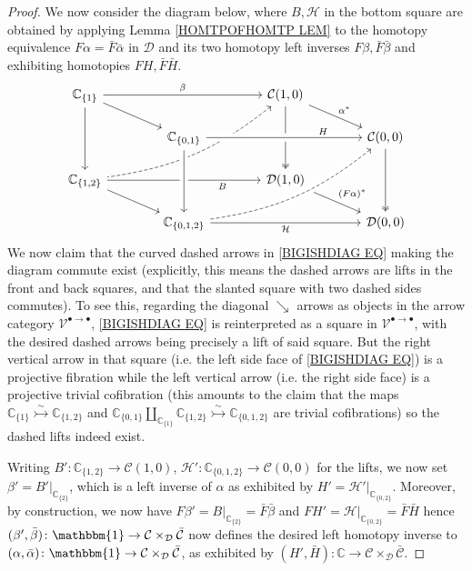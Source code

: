 \documentclass[a4paper,10pt
,draft
]{article}%
\numberwithin{equation}{section}
\numberwithin{figure}{section}
\theoremstyle{definition} %
\newcommand{\V}{\ensuremath{\mathcal V}}
\newcommand{\1}{\ensuremath{\mathbbm 1}}%
\begin{document}
\begin{proof}
We now consider the diagram below, 
where $B, \mathcal{H}$ in the bottom square
are obtained by applying Lemma \ref{HOMTPOFHOMTP LEM}
to the homotopy equivalence 
$F\alpha = \bar{F} \bar{\alpha}$ in $\mathcal{D}$
and its two homotopy left inverses
$F\beta, \bar{F} \bar{\beta}$
and exhibiting homotopies
$F H, \bar{F} \bar{H}$.
\begin{equation}\label{BIGISHDIAG EQ}
\begin{tikzcd}[row sep = 15pt,column sep = 40pt]
	\mathbb{C}_{\{1\}} 	\ar{rr}{\beta} \ar{rd} \ar{dd}&&
	\mathcal{C}(1,0) \ar[twoheadrightarrow]{dd} \ar{dr}{\alpha^{\**}}
	\ar[dashed,leftarrow,bend left =15]{ddll}
\\
	&
	\mathbb{C}_{\{0,1\}} \arrow[crossing over]{rr}[near end]{H} &&
	\mathcal{C}(0,0)  
	\ar[twoheadrightarrow]{dd}
\\
	\mathbb{C}_{\{1,2\}} \ar{rr}[swap,near end]{B} \ar{rd} &&
	\mathcal{D}(1,0) \ar{rd}{(F\alpha)^{\**}}
\\
	&
	\mathbb{C}_{\{0,1,2\}}
	\ar[dashed,bend right =15,crossing over]{uurr}
	\ar{rr}[swap]{\mathcal{H}} \arrow[uu, leftarrow, crossing over] &&
	\mathcal{D}(0,0)
\end{tikzcd}
\end{equation}
We now claim that the curved dashed arrows in 
\eqref{BIGISHDIAG EQ}
making the diagram commute exist
(explicitly, this means the dashed arrows are lifts in the front and back squares, and that the slanted square with two dashed sides commutes).
To see this, regarding the diagonal $\searrow$ arrows as objects in the arrow category $\V^{\bullet \to \bullet}$, 
\eqref{BIGISHDIAG EQ}
is reinterpreted as a square in $\V^{\bullet \to \bullet}$,
with the desired dashed arrows being precisely a lift of said square.
But the right vertical arrow in that square
(i.e. the left side face of \eqref{BIGISHDIAG EQ}) is a projective fibration 
while the left vertical arrow 
(i.e. the right side face)
is a projective trivial cofibration
(this amounts to the claim that the maps
$\mathbb{C}_{\{1\}} \overset{\sim}{\rightarrowtail} \mathbb{C}_{\{1,2\}}$ and
$\mathbb{C}_{\{0,1\}} \amalg_{\mathbb{C}_{\{1\}}} \mathbb{C}_{\{1,2\}} \overset{\sim}{\rightarrowtail} \mathbb{C}_{\{0,1,2\}}$
are trivial cofibrations)
so the dashed lifts indeed exist.

Writing 
$B'\colon \mathbb{C}_{\{1,2\}} \to \mathcal{C}(1,0)$,
$\mathcal{H}' \colon \mathbb{C}_{\{0,1,2\}} \to \mathcal{C}(0,0)$
for the lifts,
we now set
$\beta' = B'|_{\mathbb{C}_{\{2\}}}$,
which is a left inverse of $\alpha$
as exhibited by $H' = \mathcal{H}'|_{\mathbb{C}_{\{0,2\}}}$.
Moreover, by construction, we now have
$F\beta' = B|_{\mathbb{C}_{\{2\}}} = \bar{F} \bar{\beta}$
and 
$FH' = \mathcal{H}|_{\mathbb{C}_{\{0,2\}}} = \bar{F} \bar{H}$
hence
$(\beta',\bar{\beta})\colon \mathbbm{1} \to
\mathcal{C} \times_{\mathcal{D}}\bar{\mathcal{C}}$
now defines the desired left homotopy inverse to 
$(\alpha,\bar{\alpha}) \colon \mathbbm{1} \to
\mathcal{C} \times_{\mathcal{D}}\bar{\mathcal{C}}$,
as exhibited by
$(H',\bar{H}) \colon \mathbb{C} \to
\mathcal{C} \times_{\mathcal{D}}\bar{\mathcal{C}}$.
\end{proof}
\end{document}
